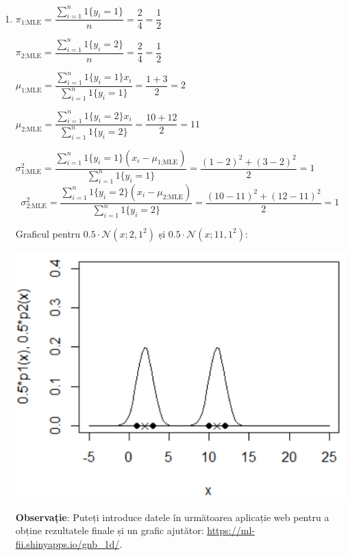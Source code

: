 \documentclass[12pt]{article}
\begin{document}
\begin{enumerate}
\begin{enumerate}
			
			\item 
			
			$\pi_\text{1;MLE} = \dfrac{\sum_{i=1}^{n}1\{y_i=1\}}{n} = \dfrac{2}{4} = \dfrac{1}{2}$
			
			$\pi_\text{2;MLE} = \dfrac{\sum_{i=1}^{n}1\{y_i=2\}}{n} = \dfrac{2}{4} = \dfrac{1}{2}$
			
			$\mu_\text{1;MLE} = \dfrac{\sum_{i=1}^n{1\{y_i=1\} x_i}}{{\sum_{i=1}^n}{1\{y_i=1\}}} = \dfrac{1+3}{2} = 2$
			
			$\mu_\text{2;MLE} = \dfrac{\sum_{i=1}^n{1\{y_i=2\} x_i}}{{\sum_{i=1}^n}{1\{y_i=2\}}} = \dfrac{10+12}{2} = 11$
			
			$\sigma^2_\text{1;MLE} = \dfrac{\sum_{i=1}^{n} 1\{y_i=1\} (x_i - \mu_\text{1;MLE})}{{\sum_{i=1}^n}{1\{y_i=1\}}} =\dfrac{(1-2)^2 + (3-2)^2}{2} = 1$
			$$\sigma^2_\text{2;MLE} = \dfrac{\sum_{i=1}^{n} 1\{y_i=2\} (x_i - \mu_\text{2;MLE})}{{\sum_{i=1}^n}{1\{y_i=2\}}} =\dfrac{(10-11)^2 + (12-11)^2}{2} = 1$$
			
			\newpage
			
			Graficul pentru $0.5 \cdot \mathcal{N}(x;2,1^2)$ și $0.5 \cdot \mathcal{N}(x;11,1^2)$:
			
			\begin{center}
				\includegraphics{screenshot010}
			\end{center}
			
			
			\textbf{Observație}: Puteți introduce datele în următoarea aplicație web pentru a obține rezultatele finale și un grafic ajutător: \url{https://ml-fii.shinyapps.io/gnb_1d/}.
			
		\end{enumerate}
		

\end{enumerate}
\end{document}
